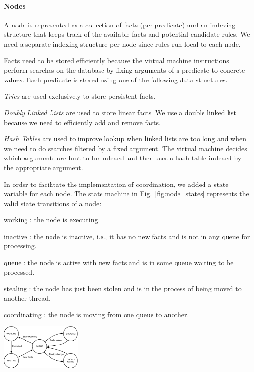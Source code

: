 \paragraph{Nodes} 
A node is represented as a collection of facts (per predicate) and an indexing structure that
keeps track of the available facts and potential candidate rules. We need
a separate indexing structure per node since rules run local to each node.

Facts need to be stored efficiently because the virtual machine instructions
perform searches on the database by fixing arguments of a predicate to concrete
values. Each predicate is stored using one of the following data structures:

\begin{tightitemize}
\item \emph{Tries} are used exclusively to store persistent facts.
\item \emph{Doubly Linked Lists} are used to store 
  linear facts. We use a double linked list because we need to efficiently add
  and remove facts.
\item \emph{Hash Tables} are used to improve lookup when 
  linked lists are too long and when we need to do searches filtered by
  a fixed argument. The virtual machine decides which arguments are
  best to be indexed and then uses a hash table
  indexed by the appropriate argument.
\end{tightitemize}

In order to facilitate the implementation of coordination, we added a state
variable for each node. The state machine in
Fig.~\ref{fig:node_states} represents the valid state transitions of a node:

\begin{tightdescription}
   \item[working]: the node is executing.
   \item[inactive]: the node is inactive, i.e., it has no new facts and is not in any
   queue for processing.
   \item[queue]: the node is active with new facts and is in some queue waiting
   to be processed.
   \item[stealing]: the node has just been stolen and is in the process of being
   moved to another thread.
   \item[coordinating]: the node is moving from one queue to another.
\end{tightdescription}

\begin{topfig}
   \centering
   \includegraphics[width=0.3\textwidth]{node_states.pdf}
   \vspace*{.5ex}
\end{topfig}

